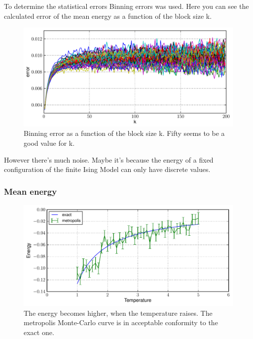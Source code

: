\documentclass[12pt,a4paper]{scrartcl}
\begin{document}
To determine the statistical errors Binning errors was used. Here you can see the calculated error of the mean energy as a function of the block size k.

\begin{figure}[H]
\includegraphics[width=14.0cm]{../plots/Binning_error.pdf}
\caption{Binning error as a function of the block size k. Fifty seems to be a good value for k.}
\end{figure}

However there's much noise. Maybe it's because the energy of a fixed configuration of the finite Ising Model can only have discrete values.

\subsubsection{Mean energy}
\begin{figure}[H]
\includegraphics[width=14.0cm]{../plots/Mean_energy.pdf}
\caption{The energy becomes higher, when the temperature raises. The metropolis Monte-Carlo curve is in acceptable conformity to the exact one.}
\end{figure}
\end{document}
